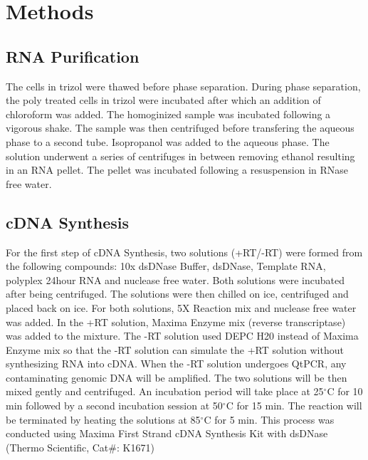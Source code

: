 \documentclass[journal, a4paper]{IEEEtran}
\begin{document}



\section{Methods}
    \subsection{RNA Purification}
      The cells in trizol were thawed before phase separation. During phase separation,
      the poly treated cells in trizol were incubated after which an addition of chloroform was added.
      The homoginized sample was incubated following a vigorous shake. The sample was then centrifuged before transfering the aqueous phase
      to a second tube. Isopropanol was added to the aqueous phase. The solution underwent a series of centrifuges in between removing ethanol
      resulting in an RNA pellet. The pellet was incubated following a resuspension in RNase free water.

    \subsection{cDNA Synthesis}
      For the first step of cDNA Synthesis, two solutions (+RT/-RT) were formed from the following compounds:
      10x dsDNase Buffer, dsDNase, Template RNA, polyplex 24hour RNA and nuclease free water.
      Both solutions were incubated after being centrifuged. The solutions were then chilled on ice, centrifuged and placed back on ice.
      For both solutions, 5X Reaction mix and nuclease free water was added. In the +RT solution, Maxima Enzyme mix (reverse transcriptase) was added to the mixture.
      The -RT solution used DEPC H20 instead of Maxima Enzyme mix so that the -RT solution can simulate the +RT solution without synthesizing RNA into cDNA.
      When the -RT solution undergoes QtPCR, any contaminating genomic DNA will be amplified.
      The two solutions will be then mixed gently and centrifuged. An incubation period will take place at 25$^{\circ}$C for 10 min
      followed by a second incubation session at 50$^{\circ}$C for 15 min.
      The reaction will be terminated by heating the solutions at 85$^{\circ}$C for 5 min.
      This process was conducted using Maxima First Strand cDNA Synthesis Kit with dsDNase (Thermo Scientific, Cat#: K1671)
\end{document}
